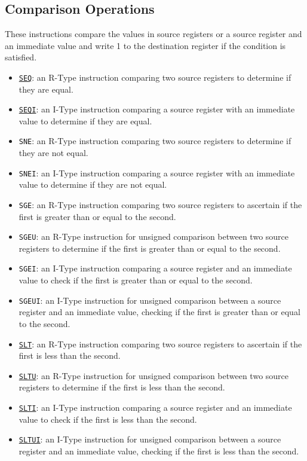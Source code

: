 \subsection{Comparison Operations}
These instructions compare the values in source registers or a source register and an immediate value and write 1 to the destination register if the condition is satisfied.

\begin{itemize}%
	\item \underline{\texttt{SEQ}}: an R-Type instruction comparing two source registers to determine if they are equal.
	\item \underline{\texttt{SEQI}}: an I-Type instruction comparing a source register with an immediate value to determine if they are equal.
 
	\item \texttt{SNE}: an R-Type instruction comparing two source registers to determine if they are not equal.
	\item \texttt{SNEI}: an I-Type instruction comparing a source register with an immediate value to determine if they are not equal.

	\item \texttt{SGE}: an R-Type instruction comparing two source registers to ascertain if the first is greater than or equal to the second.
	\item \texttt{SGEU}: an R-Type instruction for unsigned comparison between two source registers to determine if the first is greater than or equal to the second.
	\item \texttt{SGEI}: an I-Type instruction comparing a source register and an immediate value to check if the first is greater than or equal to the second.
	\item \texttt{SGEUI}: an I-Type instruction for unsigned comparison between a source register and an immediate value, checking if the first is greater than or equal to the second.
 
	\item \underline{\texttt{SLT}}: an R-Type instruction comparing two source registers to ascertain if the first is less than the second.
	\item \underline{\texttt{SLTU}}: an R-Type instruction for unsigned comparison between two source registers to determine if the first is less than the second.
	\item \underline{\texttt{SLTI}}: an I-Type instruction comparing a source register and an immediate value to check if the first is less than the second.
	\item \underline{\texttt{SLTUI}}: an I-Type instruction for unsigned comparison between a source register and an immediate value, checking if the first is less than the second.
 

\end{itemize}
